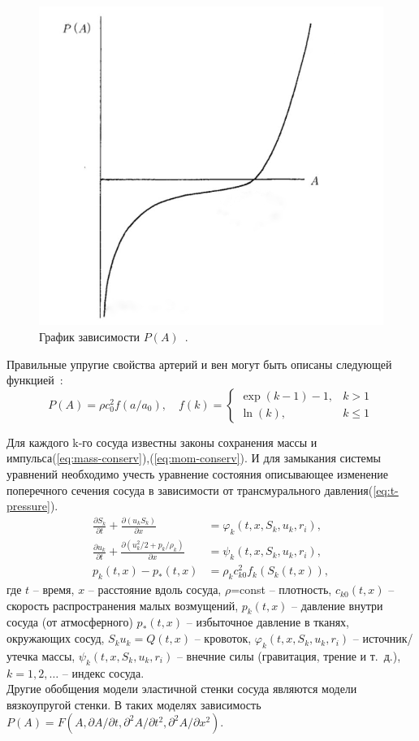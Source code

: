 \begin{figure}[h]
\centering
\includegraphics[width=0.3\linewidth]{IMG_20230309_021324_943-01.jpeg}
\caption{ График зависимости $P(A)$~\cite{pedly:1998}.}
\label{fig:mpr}
\end{figure}

Правильные упругие свойства артерий и вен могут быть описаны следующей функцией~\cite{holodov:2001}:
\begin{equation}
    \label{eq:elastic-propeties}
    P(A)=\rho c^2_0 f(a/a_0), 
    \quad
    f(k)=\begin{cases}
    \exp(k-1)-1, &k>1 \\ \ln(k), &k \leq 1
    \end{cases}
\end{equation}

Для каждого k-го сосуда известны законы сохранения массы и импульса(\ref{eq:mass-conserv}),(\ref{eq:mom-conserv}). 
И для замыкания системы уравнений необходимо учесть уравнение состояния описывающее изменение поперечного сечения сосуда в зависимости 
от трансмурального давления(\ref{eq:t-pressure}).
\begin{align}
    \label{eq:mass-conserv}
    \frac{\partial S_k}{ \partial t} + \frac{\partial(u_kS_k)}{\partial x}&=\varphi _k(t,x,S_k,u_k,r_i),\\
    \label{eq:mom-conserv}
    \frac{\partial u_k}{\partial t} + \frac{\partial(u_k^2/2+p_k/\rho_k)}{\partial x}&= \psi_k(t,x,S_k,u_k,r_i),\\
    \label{eq:t-pressure}
    p_k(t,x)-p_*(t,x)&=\rho_k c^2_{k0}f_k(S_k(t,x)),
\end{align}
где $t$ -- время, $x$ -- расстояние вдоль сосуда, $\rho$=const -- плотность, $c_{k0}(t,x)$ -- скорость распространения малых возмущений,
  $p_k(t,x)$ -- давление внутри сосуда (от атмосферного) $p_*(t,x)$ -- избыточное давление в тканях, окружающих сосуд, 
  $S_ku_k=Q(t,x)$ -- кровоток, $\varphi _k(t,x,S_k,u_k,r_i)$ -- источник/утечка массы, $\psi_k(t,x,S_k,u_k,r_i)$ -- внечние силы (гравитация, трение и т.~д.),
  $k=1,2,\ldots$ -- индекс сосуда.
\\ 
Другие обобщения модели эластичной стенки сосуда являются модели вязкоупругой стенки. В таких моделях зависимость 
$
P(A)=F(A,\partial {A} / \partial {t},\partial^2{A} / \partial {t^2},\partial^2{A} / \partial {x^2})
$.

